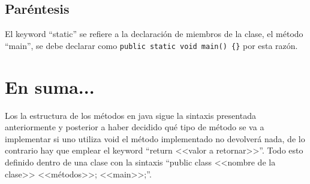 \documentclass{article}
\begin{document}
\subsection{Paréntesis}
El keyword ``static'' se refiere a la declaración de miembros de la clase, el método ``main'', se debe declarar como \verb|public static void main() {}| por esta razón.



\section{En suma...}
Los la estructura de los métodos en java sigue la sintaxis presentada anteriormente y posterior a haber decidido qué tipo de método se va a implementar si uno utiliza void el método implementado no devolverá nada, de lo contrario hay que emplear el keyword ``return <<valor a retornar>>''. Todo esto definido dentro de una clase con la sintaxis ``public class <<nombre de la clase>> {<<métodos>>; <<main>>;}''.
\end{document}
